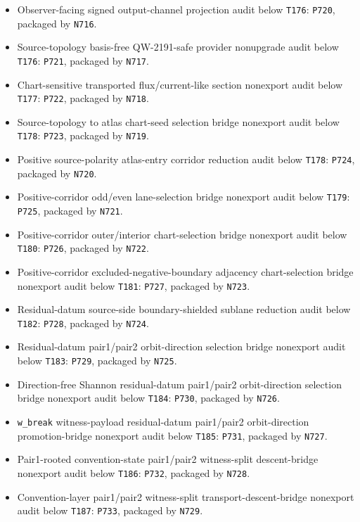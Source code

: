 \documentclass[11pt,a4paper]{article}
\begin{document}
\begin{itemize}
  \item Observer-facing signed output-channel projection audit below \texttt{T176}: \texttt{P720}, packaged by \texttt{N716}.
  \item Source-topology basis-free QW-2191-safe provider nonupgrade audit below \texttt{T176}: \texttt{P721}, packaged by \texttt{N717}.
  \item Chart-sensitive transported flux/current-like section nonexport audit below \texttt{T177}: \texttt{P722}, packaged by \texttt{N718}.
  \item Source-topology to atlas chart-seed selection bridge nonexport audit below \texttt{T178}: \texttt{P723}, packaged by \texttt{N719}.
  \item Positive source-polarity atlas-entry corridor reduction audit below \texttt{T178}: \texttt{P724}, packaged by \texttt{N720}.
  \item Positive-corridor odd/even lane-selection bridge nonexport audit below \texttt{T179}: \texttt{P725}, packaged by \texttt{N721}.
  \item Positive-corridor outer/interior chart-selection bridge nonexport audit below \texttt{T180}: \texttt{P726}, packaged by \texttt{N722}.
  \item Positive-corridor excluded-negative-boundary adjacency chart-selection bridge nonexport audit below \texttt{T181}: \texttt{P727}, packaged by \texttt{N723}.
  \item Residual-datum source-side boundary-shielded sublane reduction audit below \texttt{T182}: \texttt{P728}, packaged by \texttt{N724}.
  \item Residual-datum pair1/pair2 orbit-direction selection bridge nonexport audit below \texttt{T183}: \texttt{P729}, packaged by \texttt{N725}.
  \item Direction-free Shannon residual-datum pair1/pair2 orbit-direction selection bridge nonexport audit below \texttt{T184}: \texttt{P730}, packaged by \texttt{N726}.
  \item \texttt{w\_break} witness-payload residual-datum pair1/pair2 orbit-direction promotion-bridge nonexport audit below \texttt{T185}: \texttt{P731}, packaged by \texttt{N727}.
  \item Pair1-rooted convention-state pair1/pair2 witness-split descent-bridge nonexport audit below \texttt{T186}: \texttt{P732}, packaged by \texttt{N728}.
  \item Convention-layer pair1/pair2 witness-split transport-descent-bridge nonexport audit below \texttt{T187}: \texttt{P733}, packaged by \texttt{N729}.

\end{itemize}
\end{document}
